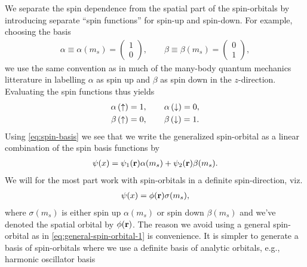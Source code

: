         We separate the spin dependence from the spatial part of the
        spin-orbitals by introducing separate ``spin functions'' for spin-up and
        spin-down.
        For example, choosing the basis
        \begin{align}
            \alpha \equiv \alpha(m_s) = \begin{pmatrix}
                1 \\
                0
            \end{pmatrix},
            \qquad
            \beta \equiv \beta(m_s) = \begin{pmatrix}
                0 \\
                1
            \end{pmatrix},
            \label{eq:spin-basis}
        \end{align}
        we use the same convention as in much of the many-body quantum mechanics
        litterature in labelling $\alpha$ as spin up and $\beta$ as spin down in
        the $z$-direction.
        Evaluating the spin functions thus yields
        \begin{gather}
            \alpha\left( \uparrow \right) = 1, \qquad \alpha\left( \downarrow \right) = 0, \\
            \beta\left( \uparrow \right) = 0, \qquad \beta\left( \downarrow \right) = 1.
        \end{gather}
        Using \autoref{eq:spin-basis} we see that we write the
        generalized spin-orbital as a linear combination of the spin basis
        functions by
        \begin{align}
            \psi(x)
            = \psi_1(\mathbf{r})\alpha(m_s)
            + \psi_2(\mathbf{r})\beta(m_s).
            \label{eq:general-spin-orbital-1}
        \end{align}
        We will for the most part work with spin-orbitals in a definite
        spin-direction, viz.
        \begin{align}
            \psi(x) = \phi(\mathbf{r})\sigma(m_s),
            \label{eq:spin-orbital}
        \end{align}
        where $\sigma(m_s)$ is either spin up $\alpha(m_s)$ or spin down
        $\beta(m_s)$ and we've denoted the spatial orbital by $\phi(\mathbf{r})$.
        The reason we avoid using a general spin-orbital as in
        \autoref{eq:general-spin-orbital-1} is convenience.
        It is simpler to generate a basis of spin-orbitals where we use a
        definite basis of analytic orbitals, e.g., harmonic oscillator basis
